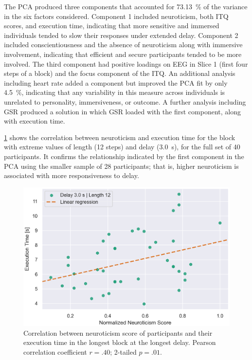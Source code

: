 \documentclass[10pt,letterpaper]{article}
\begin{document}
The PCA produced three components that accounted for \SI{73.13}{\percent} of the variance in the six factors considered.
Component 1 included neuroticism, both ITQ scores, and execution time, indicating that more sensitive and immersed individuals tended to slow their responses under extended delay.
Component 2 included conscientiousness and the absence of neuroticism along with immersive involvement, indicating that efficient and secure participants tended to be more involved.
The third component had positive loadings on EEG in Slice 1 (first four steps of a block) and the focus component of the ITQ.\@
An additional analysis including heart rate added a component but improved the PCA fit by only \SI{4.5}{\percent}, indicating that any variability in this measure across individuals is unrelated to personality, immersiveness, or outcome.
A further analysis including GSR produced a solution in which GSR loaded with the first component, along with execution time.

\cref{fig:neuro:exectime:reg} shows the correlation between neuroticism and execution time for the block with extreme values of length (12 steps) and delay (\SI{3.0}{\second}), for the full set of 40 participants.
It confirms the relationship indicated by the first component in the PCA using the smaller sample of 28 participants; that is, higher neuroticism is associated with more responsiveness to delay.

\begin{figure}[h]
    \centering
    \includegraphics[width=.8\textwidth]{plots/reg_exectime_vs_neuroticism.eps}
    \caption{Correlation between neuroticism score of participants and their execution time in the longest block at the longest delay.
    Pearson correlation coefficient \( r = .40 \); 2-tailed \( p = .01 \).}
    \label{fig:neuro:exectime:reg}
\end{figure}
\end{document}
